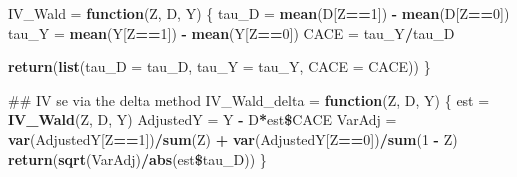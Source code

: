 \documentclass[]{article}
\newenvironment{Shaded}{\begin{snugshade}}{\end{snugshade}}
\newcommand{\KeywordTok}[1]{\textcolor[rgb]{0.13,0.29,0.53}{\textbf{#1}}}
\newcommand{\DataTypeTok}[1]{\textcolor[rgb]{0.13,0.29,0.53}{#1}}
\newcommand{\DecValTok}[1]{\textcolor[rgb]{0.00,0.00,0.81}{#1}}
\newcommand{\StringTok}[1]{\textcolor[rgb]{0.31,0.60,0.02}{#1}}
\newcommand{\ControlFlowTok}[1]{\textcolor[rgb]{0.13,0.29,0.53}{\textbf{#1}}}
\newcommand{\OperatorTok}[1]{\textcolor[rgb]{0.81,0.36,0.00}{\textbf{#1}}}
\newcommand{\NormalTok}[1]{#1}
\begin{document}
\begin{Shaded}
\begin{Highlighting}[]
\NormalTok{IV_Wald =}\StringTok{ }\ControlFlowTok{function}\NormalTok{(Z, D, Y)}
\NormalTok{\{}
\NormalTok{       tau_D =}\StringTok{ }\KeywordTok{mean}\NormalTok{(D[Z}\OperatorTok{==}\DecValTok{1}\NormalTok{]) }\OperatorTok{-}\StringTok{ }\KeywordTok{mean}\NormalTok{(D[Z}\OperatorTok{==}\DecValTok{0}\NormalTok{])}
\NormalTok{       tau_Y =}\StringTok{ }\KeywordTok{mean}\NormalTok{(Y[Z}\OperatorTok{==}\DecValTok{1}\NormalTok{]) }\OperatorTok{-}\StringTok{ }\KeywordTok{mean}\NormalTok{(Y[Z}\OperatorTok{==}\DecValTok{0}\NormalTok{])}
\NormalTok{       CACE  =}\StringTok{ }\NormalTok{tau_Y}\OperatorTok{/}\NormalTok{tau_D}
       
       \KeywordTok{return}\NormalTok{(}\KeywordTok{list}\NormalTok{(}\DataTypeTok{tau_D =}\NormalTok{ tau_D, }\DataTypeTok{tau_Y =}\NormalTok{ tau_Y,}
                   \DataTypeTok{CACE  =}\NormalTok{ CACE))}
\NormalTok{\}}

\NormalTok{## IV se via the delta method}
\NormalTok{IV_Wald_delta =}\StringTok{ }\ControlFlowTok{function}\NormalTok{(Z, D, Y)}
\NormalTok{\{}
\NormalTok{       est         =}\StringTok{ }\KeywordTok{IV_Wald}\NormalTok{(Z, D, Y)}
\NormalTok{       AdjustedY   =}\StringTok{ }\NormalTok{Y }\OperatorTok{-}\StringTok{ }\NormalTok{D}\OperatorTok{*}\NormalTok{est}\OperatorTok{\$}\NormalTok{CACE}
\NormalTok{       VarAdj      =}\StringTok{ }\KeywordTok{var}\NormalTok{(AdjustedY[Z}\OperatorTok{==}\DecValTok{1}\NormalTok{])}\OperatorTok{/}\KeywordTok{sum}\NormalTok{(Z) }\OperatorTok{+}\StringTok{ }
\StringTok{                          }\KeywordTok{var}\NormalTok{(AdjustedY[Z}\OperatorTok{==}\DecValTok{0}\NormalTok{])}\OperatorTok{/}\KeywordTok{sum}\NormalTok{(}\DecValTok{1} \OperatorTok{-}\StringTok{ }\NormalTok{Z)}
       \KeywordTok{return}\NormalTok{(}\KeywordTok{sqrt}\NormalTok{(VarAdj)}\OperatorTok{/}\KeywordTok{abs}\NormalTok{(est}\OperatorTok{\$}\NormalTok{tau_D))}
\NormalTok{\}}
\end{Highlighting}
\end{Shaded}
\end{document}
